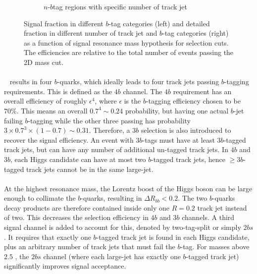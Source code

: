 \begin{figure}[htbp!]
\begin{subfigure}[b]{0.45\textwidth}
        \caption{$n$-$b$tag regions with specific number of track jet}
        \label{fig:boosted-nbjet-signal-efficiency-detail}
    \end{subfigure}
  \caption{Signal fraction in different $b$-tag categories (left) and detailed fraction in different number of track jet and $b$-tag categories (right) as a function of signal resonance mass hypothesis for selection cuts. The efficiencies are relative to the total number of events passing the 2D mass cut.}
  \label{fig:boosted-nbjet-signal-efficiency}
\end{figure}

\paragraph{}
\Xtohhb~ results in four $b$-quarks, which ideally leads to four track jets passing $b$-tagging requirements.
This is defined as the $4b$ channel.
The $4b$ requirement has an overall efficiency of roughly $\epsilon^4$, where $\epsilon$ is the $b$-tagging efficiency chosen to be $70\%$.
This means an overall $0.7^4 \sim 0.24$ probability, but having one actual $b$-jet failing $b$-tagging while the other three passing has probability $3 \times 0.7^3 \times (1-0.7) \sim 0.31$.
Therefore, a $3b$ selection is also introduced to recover the signal efficiency. 
An event with $3b$-tags must have at least $3b$-tagged track jets, but can have any number of additional un-tagged track jets.
In $4b$ and $3b$, each Higgs candidate can have at most two $b$-tagged track jets, hence $\geq 3b$-tagged track jets cannot be in the same large-\R jet.

\paragraph{}
At the highest resonance mass, the Lorentz boost of the Higgs boson can be large enough to collimate the $b$-quarks, resulting in $\Delta R_{bb} < 0.2$.
The two $b$-quarks decay products are therefore contained inside only one $R = 0.2$ track jet instead of two.
This decreases the selection efficiency in $4b$ and $3b$ channels.
A third signal channel is added to account for this, denoted by two-tag-split or simply $2bs$.
It requires that exactly one $b$-tagged track jet is found in each Higgs candidate, plus an arbitrary number of track jets that must fail the $b$-tag.
For masses above $2.5$ \TeV, the $2bs$ channel (where each large-\R jet has exactly one $b$-tagged track jet) significantly improves signal acceptance.


